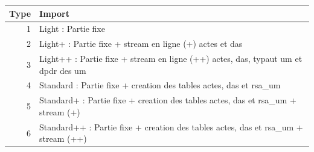 \documentclass[]{book}
\begin{document}
\begin{longtable}[]{@{}rl@{}}
\toprule
\begin{minipage}[b]{0.06\columnwidth}\raggedleft\strut
Type\strut
\end{minipage} & \begin{minipage}[b]{0.88\columnwidth}\raggedright\strut
Import\strut
\end{minipage}\tabularnewline
\midrule
\endhead
\begin{minipage}[t]{0.06\columnwidth}\raggedleft\strut
1\strut
\end{minipage} & \begin{minipage}[t]{0.88\columnwidth}\raggedright\strut
Light : Partie fixe\strut
\end{minipage}\tabularnewline
\begin{minipage}[t]{0.06\columnwidth}\raggedleft\strut
2\strut
\end{minipage} & \begin{minipage}[t]{0.88\columnwidth}\raggedright\strut
Light+ : Partie fixe + stream en ligne (+) actes et das\strut
\end{minipage}\tabularnewline
\begin{minipage}[t]{0.06\columnwidth}\raggedleft\strut
3\strut
\end{minipage} & \begin{minipage}[t]{0.88\columnwidth}\raggedright\strut
Light++ : Partie fixe + stream en ligne (++) actes, das, typaut um et
dpdr des um\strut
\end{minipage}\tabularnewline
\begin{minipage}[t]{0.06\columnwidth}\raggedleft\strut
4\strut
\end{minipage} & \begin{minipage}[t]{0.88\columnwidth}\raggedright\strut
Standard : Partie fixe + creation des tables actes, das et rsa\_um\strut
\end{minipage}\tabularnewline
\begin{minipage}[t]{0.06\columnwidth}\raggedleft\strut
5\strut
\end{minipage} & \begin{minipage}[t]{0.88\columnwidth}\raggedright\strut
Standard+ : Partie fixe + creation des tables actes, das et rsa\_um +
stream (+)\strut
\end{minipage}\tabularnewline
\begin{minipage}[t]{0.06\columnwidth}\raggedleft\strut
6\strut
\end{minipage} & \begin{minipage}[t]{0.88\columnwidth}\raggedright\strut
Standard++ : Partie fixe + creation des tables actes, das et rsa\_um +
stream (++)\strut
\end{minipage}\tabularnewline
\bottomrule
\end{longtable}
\end{document}

